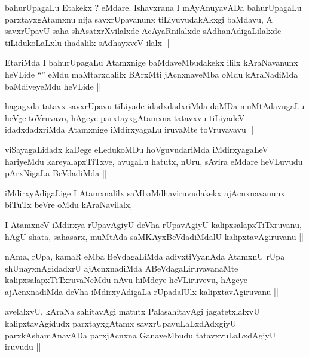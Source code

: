 \begin{artha}
bahurUpagaLu Etakekx ? eMdare. Ishavxrana I mAyAnuyavADa bahurUpagaLu
parxtayxgAtamxnu nija savxrUpavanunx tiLiyuvudakAkxgi baMdavu, A
savxrUpavU saha shAsatxrXvilalxde AcAyaRnilalxde sAdhanAdigaLilalxde
tiLidukoLaLxlu ihadalilx sAdhayxveV ilalx ||
\end{artha}


\begin{artha}
EtariMda I bahurUpagaLu Atamxnige baMdaveMbudakekx ililx kAraNavanunx
heVLide ``\stext'' eMdu maMtarxdalilx BArxMti jAcnxnaveMba oMdu
kAraNadiMda baMdiveyeMdu heVLide ||
\end{artha}

\begin{artha}
hagagxda tatavx savxrUpavu tiLiyade idadxdadxriMda daMDa muMtAdavugaLu
heVge toVruvavo, hAgeye parxtayxgAtamxna tatavxvu tiLiyadeV
idadxdadxriMda Atamxnige iMdirxyagaLu iruvaMte toVruvavavu || 
\end{artha}


\begin{artha}
viSayagaLidadx kaDege eLedukoMDu hoVguvudariMda iMdirxyagaLeV
hariyeMdu kareyalapxTiTxve, avugaLu hatutx, nUru, sAvira eMdare
heVLuvudu pArxNigaLa BeVdadiMda ||
\end{artha}

\begin{artha}
iMdirxyAdigaLige I Atamxnalilx saMbaMdhaviruvudakekx ajAcnxnavanunx
biTuTx beVre oMdu kAraNavilalx,
\end{artha}

\begin{artha}
I AtamxneV iMdirxya rUpavAgiyU deVha rUpavAgiyU
kalipxsalapxTiTxruvanu, hAgU shata, sahasarx, muMtAda
saMKAyxBeVdadiMdalU kalipxtavAgiruvanu ||
\end{artha}

\begin{artha}
nAma, rUpa, kamaR eMba BeVdagaLiMda adivxtiVyanAda AtamxnU rUpa
shUnayxnAgidadxrU ajAcnxnadiMda ABeVdagaLiruvavanaMte
kalipxsalapxTiTxruvaNeMdu nAvu hiMdeye heVLiruvevu, hAgeye
ajAcnxnadiMda deVha iMdirxyAdigaLa rUpadalUlx kalipxtavAgiruvanu ||
\end{artha}

\begin{artha}
avelalxvU, kAraNa sahitavAgi matutx PalasahitavAgi jagatetxlalxvU
kalipxtavAgidudx parxtayxgAtamx savxrUpavuLaLxdAdxgiyU
parxkAshamAnavADa parxjAcnxna GanaveMbudu tatavxvuLaLxdAgiyU iruvudu ||
\end{artha}

